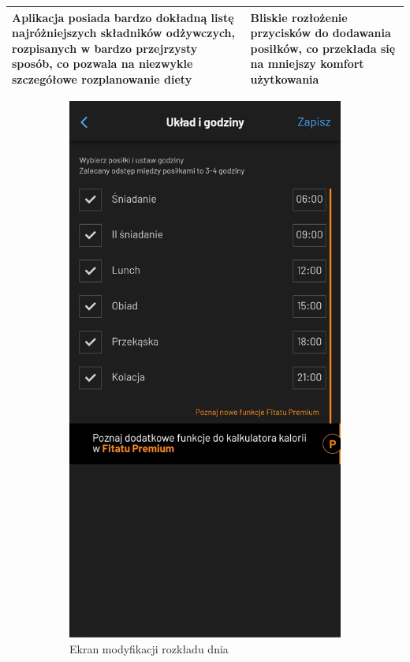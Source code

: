 \documentclass[12pt, a4paper]{article}
\begin{document}
\begin{sloppypar}
{{{\begin{center}
\begin{tabularx}{ \textwidth } {
          | >{\centering\arraybackslash}X
          | >{\centering\arraybackslash}X
          | }
         \hline
         Aplikacja posiada bardzo dokładną listę najróżniejszych składników odżywczych,
         rozpisanych w bardzo przejrzysty sposób, co pozwala na niezwykle szczegółowe
         rozplanowanie diety & 
         Bliskie rozłożenie przycisków do dodawania posiłków, co przekłada się na
         mniejszy komfort użytkowania \\
         \hline
        \end{tabularx}
      \end{center}
      \begin{figure}[H]
        \centering
        \begin{subfigure}{.5\textwidth}
          \centering
          \includegraphics[width=.6\linewidth]{fitatu_pro_2.jpg}
          \caption{Ekran modyfikacji rozkładu dnia}
          \label{fig:subfit1}
        \end{subfigure}%
        \begin{subfigure}{.5\textwidth}
          \centering

\end{subfigure}
\end{figure}}}}
\end{sloppypar}
\end{document}
